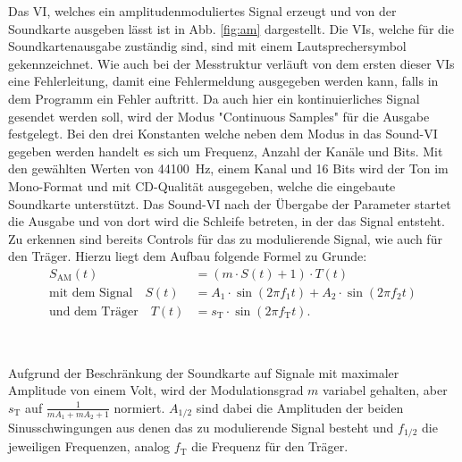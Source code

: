 Das VI, welches ein amplitudenmoduliertes Signal erzeugt und von der Soundkarte ausgeben lässt ist in Abb. \ref{fig:am} dargestellt.
Die VIs, welche für die Soundkartenausgabe zuständig sind, sind mit einem Lautsprechersymbol gekennzeichnet. 
Wie auch bei der Messtruktur verläuft von dem ersten dieser VIs eine Fehlerleitung, damit eine Fehlermeldung ausgegeben werden kann, falls in dem Programm ein Fehler auftritt.
Da auch hier ein kontinuierliches Signal gesendet werden soll, wird der Modus "Continuous Samples" für die Ausgabe festgelegt.
Bei den drei Konstanten welche neben dem Modus in das Sound-VI gegeben werden handelt es sich um Frequenz, Anzahl der Kanäle und Bits.
Mit den gewählten Werten von \SI{44100}{\hertz}, einem Kanal und 16 Bits wird der Ton im Mono-Format und mit CD-Qualität ausgegeben, welche die eingebaute Soundkarte unterstützt.
Das Sound-VI nach der Übergabe der Parameter startet die Ausgabe und von dort wird die Schleife betreten, in der das Signal entsteht.
Zu erkennen sind bereits Controls für das zu modulierende Signal, wie auch für den Träger.
Hierzu liegt dem Aufbau folgende Formel zu Grunde:
\begin{align}
	\label{eq:AM1} S_\text{AM}(t) &= (m \cdot S(t) + 1) \cdot T(t) \\
	\label{eq:AM2} \text{mit dem Signal} \quad S(t) &= A_1 \cdot \sin{(2\pi f_1 t)} + A_2 \cdot \sin{(2\pi f_2 t)}\\
	\label{eq:AM3} \text{und dem Träger} \quad T(t) &= s_\text{T} \cdot \sin{(2\pi f_\text{T} t)}.
\end{align} 

\

Aufgrund der Beschränkung der Soundkarte auf Signale mit maximaler Amplitude von einem Volt, wird der Modulationsgrad $m$ variabel gehalten, aber $s_\text{T}$ auf $\frac{1}{mA_1 + mA_2 + 1}$ normiert. 
$A_{1/2}$ sind dabei die Amplituden der beiden Sinusschwingungen aus denen das zu modulierende Signal besteht und $f_{1/2}$ die jeweiligen Frequenzen, analog $f_\text{T}$ die Frequenz für den Träger.

